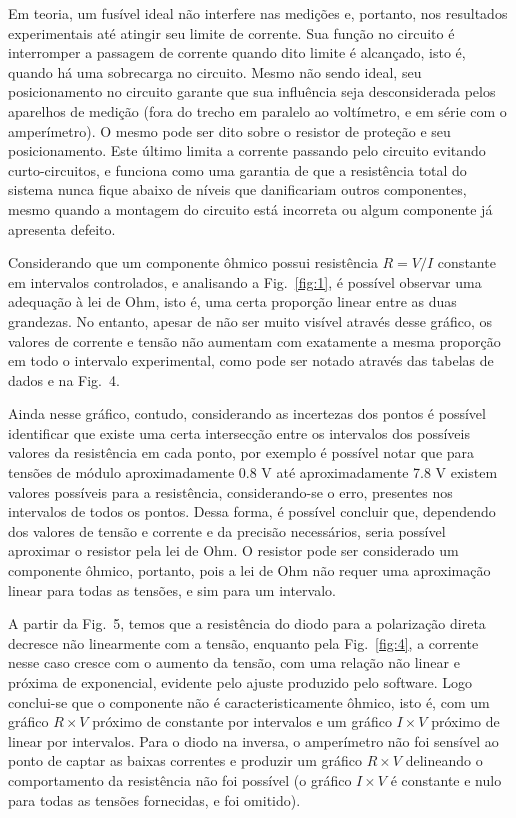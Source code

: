 Em teoria, um fusível ideal não interfere nas medições e, portanto, nos resultados experimentais até atingir seu limite de corrente. Sua função no circuito é interromper a passagem de corrente quando dito limite é alcançado, isto é, quando há uma sobrecarga no circuito. Mesmo não sendo ideal, seu posicionamento no circuito garante que sua influência seja desconsiderada pelos aparelhos de medição (fora do trecho em paralelo ao voltímetro, e em série com o amperímetro). O mesmo pode ser dito sobre o resistor de proteção e seu posicionamento. Este último limita a corrente passando pelo circuito evitando curto-circuitos, e funciona como uma garantia de que a resistência total do sistema nunca fique abaixo de níveis que danificariam outros componentes, mesmo quando a montagem do circuito está incorreta ou algum componente já apresenta defeito.

Considerando que um componente ôhmico possui resistência $R=V/I$ constante em intervalos controlados, e analisando a Fig.~\ref{fig:1}, é possível observar uma adequação à lei de Ohm, isto é, uma certa proporção linear entre as duas grandezas. No entanto, apesar de não ser muito visível através desse gráfico, os valores de corrente e tensão não aumentam com exatamente a mesma proporção em todo o intervalo experimental, como pode ser notado através das tabelas de dados e na Fig.~4.

Ainda nesse gráfico, contudo, considerando as incertezas dos pontos é possível identificar que existe uma certa intersecção entre os intervalos dos possíveis valores da resistência em cada ponto, por exemplo é possível notar que para tensões de módulo aproximadamente 0.8 V até aproximadamente 7.8 V existem valores possíveis para a resistência, considerando-se o erro, presentes nos intervalos de todos os pontos. Dessa forma, é possível concluir que, dependendo dos valores de tensão e corrente e da precisão necessários, seria possível aproximar o resistor pela lei de Ohm. O resistor pode ser considerado um componente ôhmico, portanto, pois a lei de Ohm não requer uma aproximação linear para todas as tensões, e sim para um intervalo.

A partir da Fig.~5, temos que a resistência do diodo para a polarização direta decresce não linearmente
com a tensão, enquanto pela Fig.~\ref{fig:4}, a corrente nesse caso cresce com o aumento da tensão, com uma relação não linear e próxima de exponencial, evidente pelo ajuste produzido pelo software. Logo  
conclui-se que o componente não é caracteristicamente ôhmico, isto é, com um gráfico $R\times V$ próximo de constante por intervalos e um gráfico $I\times V$ próximo de linear por intervalos. Para o diodo na inversa, o amperímetro não foi sensível ao ponto de captar as baixas correntes e produzir um gráfico $R\times V$ delineando o comportamento da resistência não foi possível (o gráfico $I\times V$ é constante e nulo para todas as tensões fornecidas, e foi omitido). 

